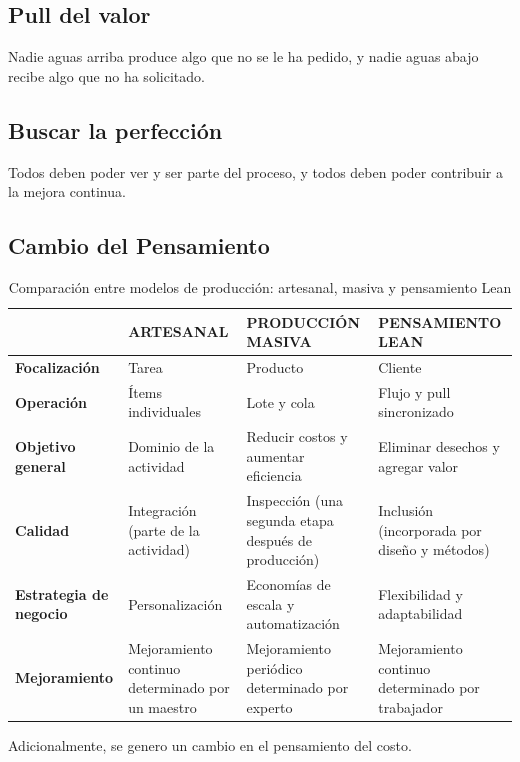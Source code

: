 \subsection{Pull del valor}

Nadie aguas arriba produce algo que no se le ha pedido, y nadie aguas abajo recibe algo que no ha solicitado.

\subsection{Buscar la perfección}

Todos deben poder ver y ser parte del proceso, y todos deben poder contribuir a la mejora continua.

\subsection{Cambio del Pensamiento}

\begin{table}[H]
\centering
\begin{tabularx}{\textwidth}{|l|X|X|X|}
\hline
\textbf{} & \textbf{ARTESANAL} & \textbf{PRODUCCIÓN MASIVA} & \textbf{PENSAMIENTO LEAN} \\
\hline
\textbf{Focalización} & Tarea & Producto & Cliente \\
\hline
\textbf{Operación} & Ítems individuales & Lote y cola & Flujo y pull sincronizado \\
\hline
\textbf{Objetivo general} & Dominio de la actividad & Reducir costos y aumentar eficiencia & Eliminar desechos y agregar valor \\
\hline
\textbf{Calidad} & Integración (parte de la actividad) & Inspección (una segunda etapa después de producción) & Inclusión (incorporada por diseño y métodos) \\
\hline
\textbf{Estrategia de negocio} & Personalización & Economías de escala y automatización & Flexibilidad y adaptabilidad \\
\hline
\textbf{Mejoramiento} & Mejoramiento continuo determinado por un maestro & Mejoramiento periódico determinado por experto & Mejoramiento continuo determinado por trabajador \\
\hline
\end{tabularx}
\caption{Comparación entre modelos de producción: artesanal, masiva y pensamiento Lean}
\end{table}

Adicionalmente, se genero un cambio en el pensamiento del costo.


